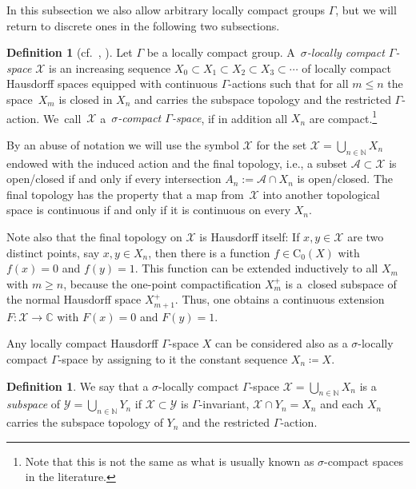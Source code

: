 \documentclass[pdftex]{sigma}
\numberwithin{equation}{section}
\theoremstyle{definition}
\newtheorem{defn}[thm]{Definition}
\newcommand{\N}{\mathbb{N}}
\newcommand{\C}{\mathbb{C}}
\newcommand{\cX}{\mathcal{X}}
\newcommand{\cY}{\mathcal{Y}}
\newcommand{\cA}{\mathcal{A}}
\newcommand{\Ct}{\mathrm{C}}
\newcommand{\Cz}{\Ct_0}
\begin{document}
In this subsection we also allow arbitrary locally compact groups $\Gamma$, but we will return to discrete ones in the following two subsections.

\begin{defn}[{cf.~\cite[Section~2]{EmeMeyDualizing}, \cite[Definition~3.1]{WulffCoassemblyRinghomo}}] Let $\Gamma$ be a locally compact group.
A~\emph{$\sigma$-locally compact $\Gamma$-space} $\cX$ is an increasing sequence $X_0\subset X_1\subset X_2\subset X_3\subset\cdots$ of locally compact Hausdorff spaces equipped with continuous $\Gamma$-actions such that for all $m \leq n$ the space~$X_m$ is closed in $X_n$ and carries the subspace topology and the restricted $\Gamma$-action.
We~call~$\cX$ a~\emph{$\sigma$-compact $\Gamma$-space}, if in addition all $X_n$ are compact.\footnote{Note that this is not the same as what is usually known as $\sigma$-compact spaces in the literature.}
\end{defn}

By an abuse of notation we will use the symbol $\cX$ for the set $\cX = \bigcup_{n \in \N} X_n$ endowed with the induced action and the final topology, i.e., a subset $\cA \subset \cX$ is open/closed if and only if every intersection $A_n := \cA \cap X_n$ is open/closed.
The final topology has the property that a map from~$\cX$ into another topological space is continuous if and only if it is continuous on every $X_n$.

Note also that the final topology on $\cX$ is Hausdorff itself: If $x,y\in \cX$ are two distinct points, say $x,y\in X_n$, then there is a function $f\in \Cz(X)$ with $f(x)=0$ and $f(y)=1$. This function can be extended inductively to all $X_m$ with $m\geq n$, because the one-point compactification $X_m^+$ is a~closed subspace of the normal Hausdorff space $X_{m+1}^+$. Thus, one obtains a continuous extension $F\colon\cX\to \C$ with $F(x)=0$ and $F(y)=1$.

Any locally compact Hausdorff $\Gamma$-space $X$ can be considered also as a $\sigma$-locally compact $\Gamma$-space by assigning to it the constant sequence $X_n\coloneqq X$.

\begin{defn}\label{def:subspace}
We say that a $\sigma$-locally compact $\Gamma$-space $\cX=\bigcup_{n\in\N}X_n$ is a \emph{subspace} of $\cY=\bigcup_{n\in\N}Y_n$ if $\cX\subset \cY$ is $\Gamma$-invariant, $\cX\cap Y_n = X_n$ and each $X_n$ carries the subspace topology of $Y_n$ and the restricted $\Gamma$-action.
\end{defn}
\end{document}
